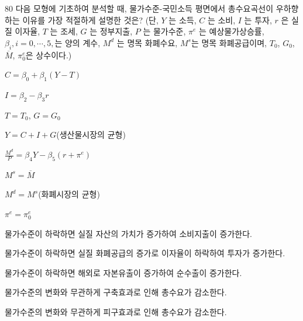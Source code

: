 \begin{question}{80}
다음 모형에 기초하여 분석할 때, 물가수준-국민소득 평면에서 총수요곡선이 우하향하는 이유를 가장 적절하게 설명한 것은? (단, $Y$ 는 소득, $C$ 는 소비, $I$ 는 투자, $r$ 은 실질 이자율, $T$ 는 조세, $G$ 는 정부지출, $P$ 는 물가수준, $\pi^{ e }$ 는 예상물가상승률, $\beta_{ i } , i=0, \cdots ,5,$는 양의 계수, $M^{ d }$ 는 명목 화폐수요, $M^{ s }$는 명목 화폐공급이며, $T_{ 0 }$, $G_{ 0 }$, $\overline{ M }$, $\pi_{ 0 }^{ e }$은 상수이다.)
\begin{framedtext}
$C= \beta_{ 0 } + \beta_{ 1 } (Y-T)$ \par
$I= \beta_{ 2 } - \beta_{ 3 } r$ \par
$T=T_{ 0 }$, $G=G_{ 0 }$ \par
$Y=C+I+G$(생산물시장의 균형) \par
$\frac{ M^{ d } } { P } = \beta_{ 4 } Y- \beta_{ 5 } (r+ \pi^{ e } )$ \par
$M^{ s } = \overline{ M }$ \par
$M^{ d } =M^{ s }$(화폐시장의 균형) \par
$\pi^{ e } = \pi_{ 0 }^{ e }$
\end{framedtext}
\begin{choices}
  \item 물가수준이 하락하면 실질 자산의 가치가 증가하여 소비지출이 증가한다.
  \item 물가수준이 하락하면 실질 화폐공급의 증가로 이자율이 하락하여 투자가 증가한다.
  \item 물가수준이 하락하면 해외로 자본유출이 증가하여 순수출이 증가한다.
  \item 물가수준의 변화와 무관하게 구축효과로 인해 총수요가 감소한다.
  \item 물가수준의 변화와 무관하게 피구효과로 인해 총수요가 감소한다.
\end{choices}
\end{question}
